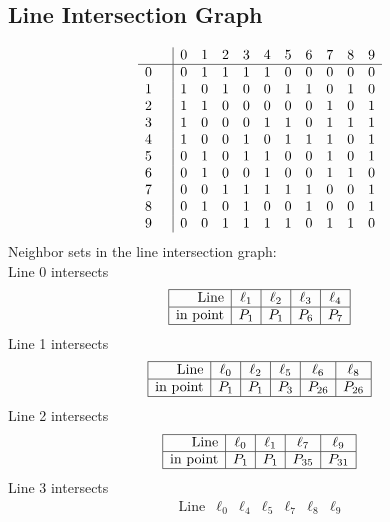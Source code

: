 \documentclass{article}
\begin{document}
{\subsection*{Line Intersection Graph}
{\arraycolsep=1pt
$$
\begin{array}{rr|*{10}r}
 &  & 0 & 1 & 2 & 3 & 4 & 5 & 6 & 7 & 8 & 9\\
\hline
0 &  & 0 & 1 & 1 & 1 & 1 & 0 & 0 & 0 & 0 & 0\\
1 &  & 1 & 0 & 1 & 0 & 0 & 1 & 1 & 0 & 1 & 0\\
2 &  & 1 & 1 & 0 & 0 & 0 & 0 & 0 & 1 & 0 & 1\\
3 &  & 1 & 0 & 0 & 0 & 1 & 1 & 0 & 1 & 1 & 1\\
4 &  & 1 & 0 & 0 & 1 & 0 & 1 & 1 & 1 & 0 & 1\\
5 &  & 0 & 1 & 0 & 1 & 1 & 0 & 0 & 1 & 0 & 1\\
6 &  & 0 & 1 & 0 & 0 & 1 & 0 & 0 & 1 & 1 & 0\\
7 &  & 0 & 0 & 1 & 1 & 1 & 1 & 1 & 0 & 0 & 1\\
8 &  & 0 & 1 & 0 & 1 & 0 & 0 & 1 & 0 & 0 & 1\\
9 &  & 0 & 0 & 1 & 1 & 1 & 1 & 0 & 1 & 1 & 0\\
\end{array}
$$
}%
Neighbor sets in the line intersection graph:\\
Line 0 intersects 
$$
\begin{array}{|r*{4}{|c}|}
\hline
\mbox{Line}  & \ell_{1} & \ell_{2} & \ell_{3} & \ell_{4}\\
\hline
\mbox{in point}  & P_{1} & P_{1} & P_{6} & P_{7}\\
\hline
\end{array}
$$
Line 1 intersects 
$$
\begin{array}{|r*{5}{|c}|}
\hline
\mbox{Line}  & \ell_{0} & \ell_{2} & \ell_{5} & \ell_{6} & \ell_{8}\\
\hline
\mbox{in point}  & P_{1} & P_{1} & P_{3} & P_{26} & P_{26}\\
\hline
\end{array}
$$
Line 2 intersects 
$$
\begin{array}{|r*{4}{|c}|}
\hline
\mbox{Line}  & \ell_{0} & \ell_{1} & \ell_{7} & \ell_{9}\\
\hline
\mbox{in point}  & P_{1} & P_{1} & P_{35} & P_{31}\\
\hline
\end{array}
$$
Line 3 intersects 
$$
\begin{array}{|r*{6}{|c}|}
\hline
\mbox{Line}  & \ell_{0} & \ell_{4} & \ell_{5} & \ell_{7} & \ell_{8} & \ell_{9}\\

\end{array}$$}
\end{document}
